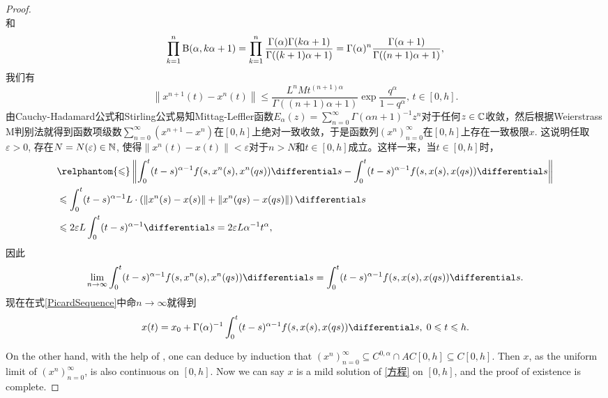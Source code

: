 \begin{proof}
\begin{equation*}
    \end{equation*}
    和
    \begin{equation*}
        \prod_{k=1}^n \mathrm{B}(\alpha, k\alpha+1)=\prod_{k=1}^n \frac{\Gamma(\alpha) \Gamma(k\alpha+1)}{\Gamma((k+1)\alpha+1)}=\Gamma(\alpha)^n \frac{\Gamma(\alpha+1)}{\Gamma((n+1)\alpha+1)},
    \end{equation*}
    我们有
    \begin{equation}
        \left\| x^{n+1}(t) - x^n(t) \right\|\leqslant \frac{L^n M t^{(n+1)\alpha}}{\Gamma((n+1)\alpha+1)} \exp \frac{q^\alpha}{1-q^\alpha},\,t\in [0,h].
    \end{equation}
    由Cauchy-Hadamard公式和Stirling公式易知Mittag-Leffler函数$E_\alpha(z)=\sum_{n=0}^{\infty}\Gamma(\alpha n+1)^{-1}z^n$对于任何$z\in \mathbb{C}$收敛，然后根据Weierstrass M判别法就得到函数项级数$\sum_{n=0}^\infty \left(x^{n+1}-x^n\right)$在$[0,h]$上绝对一致收敛，于是函数列$\left(x^n\right)_{n=0}^\infty$在$[0,h]$上存在一致极限$x$. 这说明任取$\varepsilon>0$, 存在$N=N(\varepsilon)\in \mathbb{N}$, 使得$\left\|x^n(t)-x(t)\right\|<\varepsilon$对于$n>N$和$t\in [0,h]$成立。这样一来，当$t\in [0,h]$时，
    \begin{align*}
        &\relphantom{\leqslant} \left\| \int_0^t (t-s)^{\alpha-1} f(s,x^n(s),x^n(qs))\differential s - \int_0^t (t-s)^{\alpha-1} f(s,x(s),x(qs))\differential s \right\|\\
        &\leqslant \int_0^t (t-s)^{\alpha-1} L\cdot\left(\left\|x^n(s)-x(s)\right\|+\left\|x^n(qs)-x(qs)\right\|\right) \differential s\\
        &\leqslant 2\varepsilon L\int_0^t (t-s)^{\alpha-1}\differential s = 2\varepsilon L\alpha^{-1}t^\alpha,
    \end{align*}
    因此
    \begin{equation*}
        \lim_{n\to\infty} \int_0^t (t-s)^{\alpha-1} f(s,x^n(s),x^n(qs))\differential s = \int_0^t (t-s)^{\alpha-1} f(s,x(s),x(qs))\differential s.
    \end{equation*}
    现在在式\eqref{PicardSequence}中命$n\to\infty$就得到
    \begin{equation*}
        x(t)=x_0 + \Gamma(\alpha)^{-1}\int_0^t (t-s)^{\alpha-1} f(s,x(s),x(qs))\differential s,\;0\leqslant t\leqslant h.
    \end{equation*}

    On the other hand, with the help of \cite[Proposition 3.2]{Webb}, one can deduce by induction that $\left(x^n\right)_{n=0}^\infty \subseteq C^{0,\alpha} \cap AC [0,h] \subseteq C[0,h]$. Then $x$, as the uniform limit of $\left(x^n\right)_{n=0}^\infty$, is also continuous on $[0,h]$. Now we can say $x$ is a mild solution of \cref{方程} on $[0,h]$, and the proof of existence is complete.


\end{proof}
